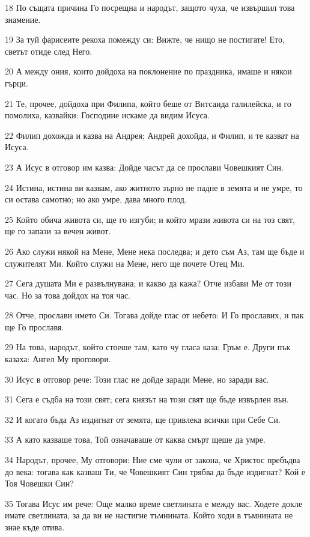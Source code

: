 \par 18 По същата причина Го посрещна и народът, защото чуха, че извършил това знамение.
\par 19 За туй фарисеите рекоха помежду си: Вижте, че нищо не постигате! Ето, светът отиде след Него.
\par 20 А между ония, които дойдоха на поклонение по праздника, имаше и някои гърци.
\par 21 Те, прочее, дойдоха при Филипа, който беше от Витсаида галилейска, и го помолиха, казвайки: Господине искаме да видим Исуса.
\par 22 Филип дохожда и казва на Андрея; Андрей дохойда, и Филип, и те казват на Исуса.
\par 23 А Исус в отговор им казва: Дойде часът да се прослави Човешкият Син.
\par 24 Истина, истина ви казвам, ако житното зърно не падне в земята и не умре, то си остава самотно; но ако умре, дава много плод.
\par 25 Който обича живота си, ще го изгуби; и който мрази живота си на тоз свят, ще го запази за вечен живот.
\par 26 Ако служи някой на Мене, Мене нека последва; и дето съм Аз, там ще бъде и служителят Ми. Който служи на Мене, него ще почете Отец Ми.
\par 27 Сега душата Ми е развълнувана; и какво да кажа? Отче избави Ме от този час. Но за това дойдох на тоя час.
\par 28 Отче, прослави името Си. Тогава дойде глас от небето: И Го прославих, и пак ще Го прославя.
\par 29 На това, народът, който стоеше там, като чу гласа каза: Гръм е. Други пък казаха: Ангел Му проговори.
\par 30 Исус в отговор рече: Този глас не дойде заради Мене, но заради вас.
\par 31 Сега е съдба на този свят; сега князът на този свят ще бъде извърлен вън.
\par 32 И когато бъда Аз издигнат от земята, ще привлека всички при Себе Си.
\par 33 А като казваше това, Той означаваше от каква смърт щеше да умре.
\par 34 Народът, прочее, Му отговори: Ние сме чули от закона, че Христос пребъдва до века: тогава как казваш Ти, че Човешкият Син трябва да бъде издигнат? Кой е Тоя Човешки Син?
\par 35 Тогава Исус им рече: Още малко време светлината е между вас. Ходете докле имате светлината, за да ви не настигне тъмнината. Който ходи в тъмнината не знае къде отива.
